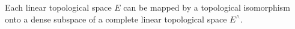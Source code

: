 Each linear topological space $E$ can be mapped by a topological isomorphism onto a dense subspace of a complete linear topological space $E^{\wedge}$.

